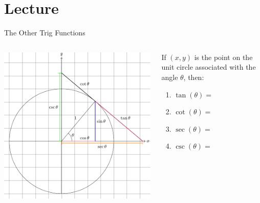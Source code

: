 \documentclass[presentation]{beamer}
\begin{document}
\section{Lecture}
\label{sec:org68df652}
\begin{frame}[label={sec:org1b1051f}]{The Other Trig Functions}
\begin{columns}
\begin{column}{0.45\columnwidth}
\includegraphics[width=\textwidth]{./circ.pdf}
\end{column}

\begin{column}{0.45\columnwidth}
\begin{block}{}
If \(\left( x,y \right)\) is the point on the unit circle associated with the
angle \(\theta\), then:
\begin{enumerate}
\item \(\tan(\theta) =\)
\item \(\cot(\theta) =\)
\item \(\sec(\theta) =\)
\item \(\csc(\theta) =\)
\end{enumerate}
\end{block}
\end{column}
\end{columns}
\end{frame}
\end{document}

